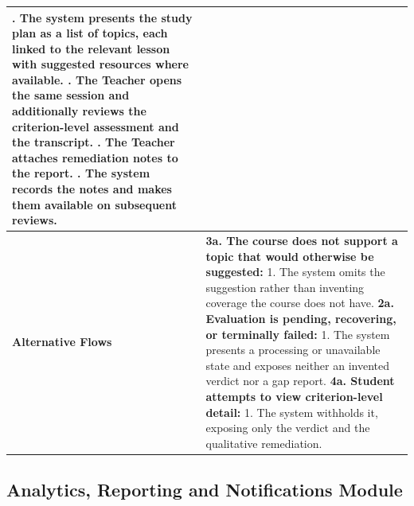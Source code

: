 \begin{longtable}{|>{\raggedright\arraybackslash}p{}|>{\raggedright\arraybackslash}p{}|}
3. The system presents the study plan as a list of topics, each linked to the relevant lesson with suggested resources where available. \newline
4. The Teacher opens the same session and additionally reviews the criterion-level assessment and the transcript. \newline
5. The Teacher attaches remediation notes to the report. \newline
6. The system records the notes and makes them available on subsequent reviews. \\ \hline
\textbf{Alternative Flows} &
\textbf{3a. The course does not support a topic that would otherwise be suggested:} \newline
\hspace*{1em}1. The system omits the suggestion rather than inventing coverage the course does not have. \newline
\textbf{2a. Evaluation is pending, recovering, or terminally failed:} \newline
\hspace*{1em}1. The system presents a processing or unavailable state and exposes neither an invented verdict nor a gap report. \newline
\textbf{4a. Student attempts to view criterion-level detail:} \newline
\hspace*{1em}1. The system withholds it, exposing only the verdict and the qualitative remediation. \\
\end{longtable}

\subsection{Analytics, Reporting and Notifications Module}

